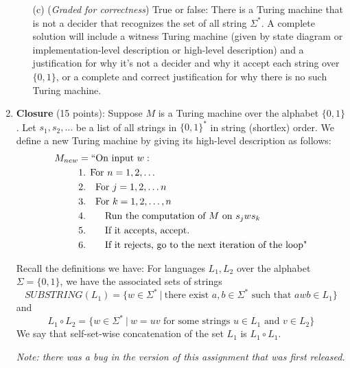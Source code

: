 \documentclass[12pt, oneside]{article}
\newcommand{\gradeCorrect}{({\it Graded for correctness}) }
\begin{document}
\begin{enumerate}[wide, labelwidth=!, labelindent=0pt]
\begin{enumerate}
\item[(c)]\gradeCorrect True or false: There is a Turing machine that is not a decider that recognizes 
the set of all string $\Sigma^*$.  A complete solution will include a witness Turing machine 
(given by 
state diagram or implementation-level description or high-level description) and a justification 
for why it's not a decider and why it accept each string over $\{0,1\}$, or a complete and correct
justification for why there is no such Turing machine.
\end{enumerate}

\item\textbf{Closure} (15 points):
Suppose $M$ is a Turing machine over the alphabet $\{0,1\}$. 
Let $s_1, s_2, \ldots$ be a list of all strings in 
$\{0,1\}^*$ in string (shortlex) order.
We define a new Turing machine 
by giving its high-level description as follows: 
\begin{align*}
   M_{new} &= ``\text{On input }w:\\
    &\text{1. For $n = 1, 2, \ldots$}\\
    &\text{2.~~~For $j = 1, 2, \ldots n$} \\
    &\text{3.~~~For $k = 1, 2, \ldots, n$} \\
    &\text{4.~~~~~~Run the computation of $M$ on $s_jws_k$}\\
    &\text{5.~~~~~~If it accepts, accept.}\\
    &\text{6.~~~~~~If it rejects, go to the next iteration of the loop"}\\
\end{align*}

Recall the definitions we have: 
For languages $L_1, L_2$ over the alphabet $\Sigma = \{0,1\}$, we have the 
associated sets of strings
\[
   SUBSTRING(L_1) = \{ w \in \Sigma^* ~|~ \text{there exist } a,b \in \Sigma^* \text{ such that } awb \in L_1\}
\]
and 
\[
   L_1 \circ L_2 = \{ w \in \Sigma^* ~|~ w = uv \text{ for some strings } u \in L_1 \text{ and } v \in L_2 \}
\]
We say that self-set-wise concatenation of the set $L_1$ is $L_1 \circ L_1$.


{\it Note: there was a bug in the version of this assignment 
that was first released.}


\end{enumerate}
\end{document}
